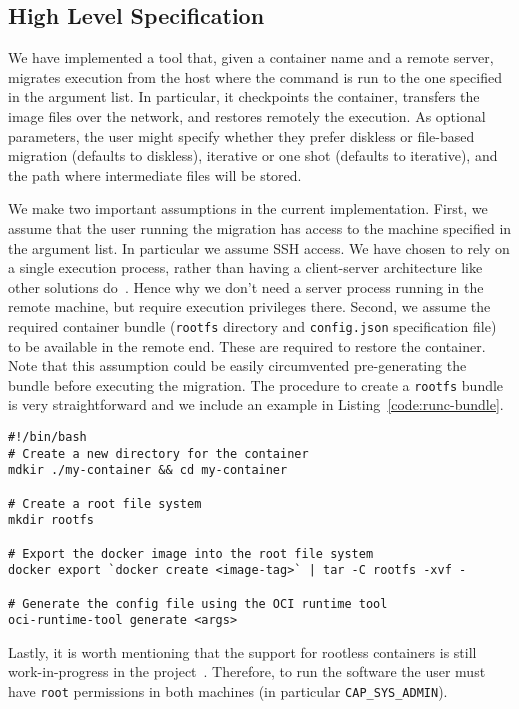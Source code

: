 \subsection{High Level Specification}

We have implemented a tool that, given a container name and a remote server,
migrates execution from the host where the command is run to the one specified
in the argument list.
In particular, it checkpoints the container, transfers the image files over the
network, and restores remotely the execution.
As optional parameters, the user might specify whether they prefer diskless or
file-based migration (defaults to diskless), iterative or one shot (defaults to
iterative), and the path where intermediate files will be stored.

We make two important assumptions in the current implementation.
First, we assume that the user running the migration has access to the machine
specified in the argument list.
In particular we assume SSH access.
We have chosen to rely on a single execution process, rather than having a
client-server architecture like other solutions do~\cite{criu-phaul}.
Hence why we don't need a server process running in the remote machine, but
require execution privileges there.
Second, we assume the required container bundle (\texttt{rootfs} directory and
\texttt{config.json} specification file) to be available in the remote end.
These are required to restore the container.
Note that this assumption could be easily circumvented pre-generating the
bundle before executing the migration.
The procedure to create a \texttt{rootfs} bundle is very straightforward and we
include an example in Listing~\ref{code:runc-bundle}.
\begin{lstlisting}[style=Bash,caption={Commands to generate an OCI bundle to run a container using \runc.},label={code:runc-bundle}]
#!/bin/bash
# Create a new directory for the container
mdkir ./my-container && cd my-container

# Create a root file system
mkdir rootfs

# Export the docker image into the root file system
docker export `docker create <image-tag>` | tar -C rootfs -xvf -

# Generate the config file using the OCI runtime tool
oci-runtime-tool generate <args>
\end{lstlisting}
Lastly, it is worth mentioning that the support for rootless containers is
still work-in-progress in the \criu project~\cite{criu-user-mode}.
Therefore, to run the software the user must have \texttt{root} permissions in
both machines (in particular \texttt{CAP\_SYS\_ADMIN}).


